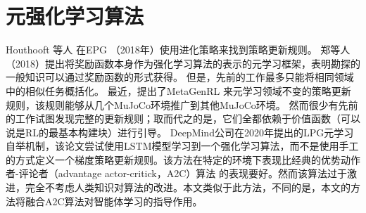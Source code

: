 \section{元强化学习算法}
Houthooft 等人 在EPG \cite{houthooftEvolvedPolicyGradients2018} （2018年）使用进化策略来找到策略更新规则。
郑等人 \cite{zhengWhatCanLearned2020}（2018）提出将奖励函数本身作为强化学习算法的表示的元学习框架，表明勘探的一般知识可以通过奖励函数的形式获得。
但是，先前的工作最多只能将相同领域中的相似任务概括化。
最近，提出了MetaGenRL \cite{kirschImprovingGeneralizationMeta2019} 来元学习领域不变的策略更新规则，该规则能够从几个MuJoCo环境推广到其他MuJoCo环境。
然而很少有先前的工作试图发现完整的更新规则；取而代之的是，它们全都依赖于价值函数（可以说是RL的最基本构建块）进行引导。
DeepMind公司在2020年提出的LPG元学习自举机制\cite{ohDiscoveringReinforcementLearning2020}，该论文尝试使用LSTM模型学习到一个强化学习算法，而不是使用手工的方式定义一个梯度策略更新规则。该方法在特定的环境下表现比经典的优势动作者-评论者（advantage actor-critick，A2C）算法 \cite{mnihAsynchronousMethodsDeep2016} 的表现要好。然而该算法过于激进，完全不考虑人类知识对算法的改进。本文类似于此方法，不同的是，本文的方法将融合A2C算法对智能体学习的指导作用。